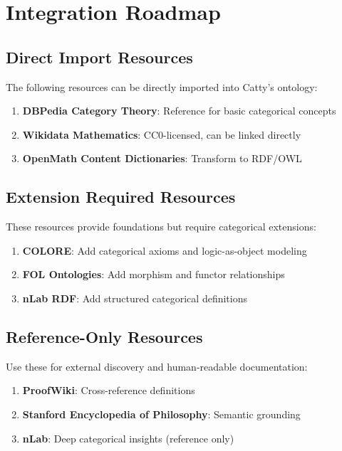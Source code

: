 \section{Integration Roadmap}

\subsection{Direct Import Resources}

The following resources can be directly imported into Catty's ontology:

\begin{enumerate}
  \item \textbf{DBPedia Category Theory}: Reference for basic categorical concepts
  \item \textbf{Wikidata Mathematics}: CC0-licensed, can be linked directly
  \item \textbf{OpenMath Content Dictionaries}: Transform to RDF/OWL
\end{enumerate}

\subsection{Extension Required Resources}

These resources provide foundations but require categorical extensions:

\begin{enumerate}
  \item \textbf{COLORE}: Add categorical axioms and logic-as-object modeling
  \item \textbf{FOL Ontologies}: Add morphism and functor relationships
  \item \textbf{nLab RDF}: Add structured categorical definitions
\end{enumerate}

\subsection{Reference-Only Resources}

Use these for external discovery and human-readable documentation:

\begin{enumerate}
  \item \textbf{ProofWiki}: Cross-reference definitions
  \item \textbf{Stanford Encyclopedia of Philosophy}: Semantic grounding
  \item \textbf{nLab}: Deep categorical insights (reference only)
\end{enumerate}

